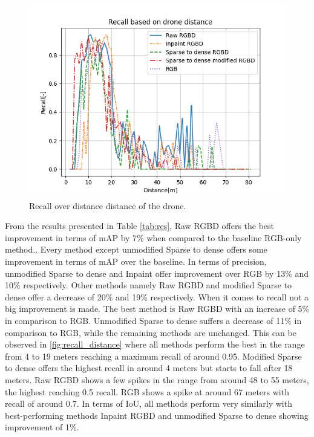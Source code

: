 \documentclass[twoside]{ctuthesis}
\theoremstyle{plain}
\theoremstyle{definition}
\theoremstyle{note}
\begin{document}
\begin{figure}
	\centering
	\includegraphics[width=\textwidth]{recall_distance.png}
	\caption{Recall over distance distance of the drone.} \label{fig:recall_distance}
\end{figure}
From the results presented in Table \ref{tab:res}, Raw RGBD offers the best improvement in terms of mAP by 7\% when compared to the baseline RGB-only method.. Every method except unmodified Sparse to dense offers some improvement in terms of mAP over the baseline. In terms of precision, unmodified Sparse to dense and Inpaint offer improvement over RGB by 13\% and 10\% respectively. Other methods namely Raw RGBD and modified Sparse to dense offer a decrease of 20\% and 19\% respectively. When it comes to recall not a big improvement is made. The best method is Raw RGBD with an increase of 5\% in comparison to RGB. Unmodified Sparse to dense suffers a decrease of 11\% in comparison to RGB, while the remaining methods are unchanged. This can be observed in \autoref{fig:recall_distance} where all methods perform the best in the range from 4 to 19 meters reaching a maximum recall of around 0.95. Modified Sparse to dense offers the highest recall in around 4 meters but starts to fall after 18 meters. Raw RGBD shows a few spikes in the range from around 48 to 55 meters, the highest reaching 0.5 recall. RGB shows a spike at around 67 meters with recall of around 0.7. In terms of IoU, all methods perform very similarly with best-performing methods Inpaint RGBD and unmodified Sparse to dense showing improvement of 1\%.
\end{document}
